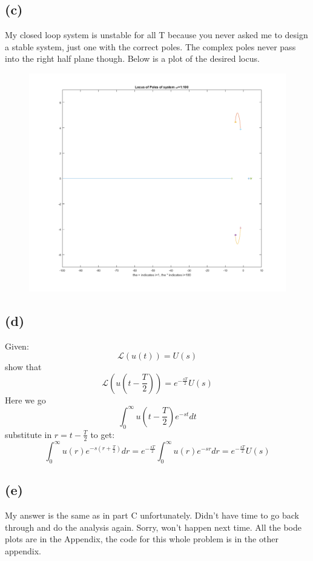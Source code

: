 \documentclass{article}
\begin{document}
\subsection*{(c)}
My closed loop system is unstable for all T because you never asked me to design a stable system, just one with the correct poles. The complex poles never pass into the right half plane though. Below is a plot of the desired locus.
\begin{figure}[H]
    \centering
    \includegraphics[width=\textwidth]{HW1_P4c.png}
\end{figure}

\subsection*{(d)}
Given:
\[\mathcal{L}(u(t))=U(s)\]
show that
\[\mathcal{L}(u(t-\frac{T}{2}))=e^{-\frac{sT}{2}}U(s)\]
Here we go
\[\int_0^\infty u(t-\frac{T}{2})e^{-st}dt\]
substitute in $r=t-\frac{T}{2}$ to get:
\[\int_0^\infty u(r)e^{-s(r+\frac{T}{2})}dr=e^{-\frac{sT}{2}}\int_0^\infty u(r)e^{-sr}dr=e^{-\frac{sT}{2}}U(s)\]

\subsection*{(e)}
My answer is the same as in part C unfortunately. Didn't have time to go back through and do the analysis again. Sorry, won't happen next time. All the bode plots are in the Appendix, the code for this whole problem is in the other appendix.
\end{document}
